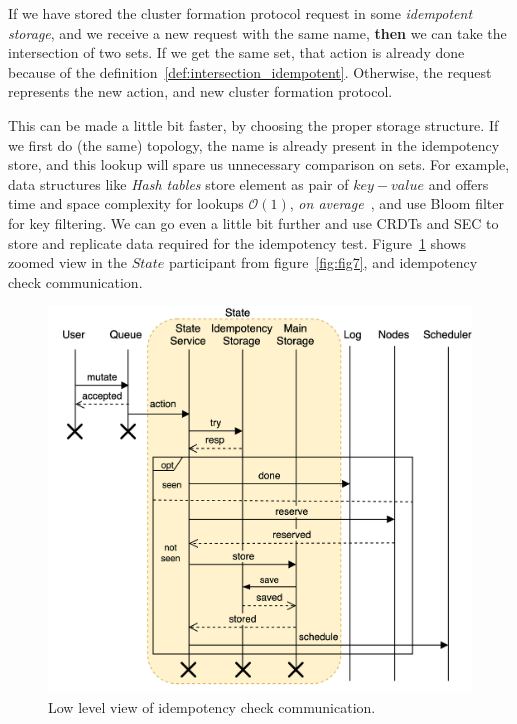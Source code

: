 \noindent
If we have stored the cluster formation protocol request in some \emph{idempotent storage}, and we receive a new request with the same name, \textbf{then} we can take the intersection of two sets. If we get the same set, that action is already done because of the definition~\ref{def:intersection_idempotent}. Otherwise, the request represents the new action, and new cluster formation protocol. 

This can be made a little bit faster, by choosing the proper storage structure. If we first do (the same) topology, the name is already present in the idempotency store, and this lookup will spare us unnecessary comparison on sets. For example, data structures like \emph{Hash tables} store element as pair of $key-value$ and offers time and space complexity for lookups $\mathcal{O}(1)$, \textit{on average}~\cite{0023376}, and use Bloom filter~\cite{TarkomaRL12} for key filtering.  We can go even a little bit further and use CRDTs and SEC to store and replicate data required for the idempotency test. Figure~\ref{fig:fig13} shows zoomed view in the $State$ participant from figure~\ref{fig:fig7}, and idempotency check communication.

\begin{figure}[H]
	\begin{center}
		\includegraphics[scale=0.6]{images/Figure13}
	\end{center}
	\vspace{-0.7cm}
	\caption{Low level view of idempotency check communication.}
	\label{fig:fig13}
\end{figure}

